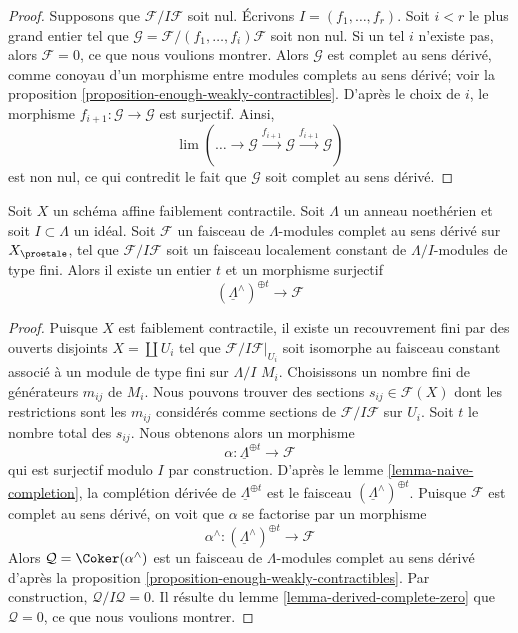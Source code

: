 \begin{proof}
Supposons que $\mathcal{F}/I\mathcal{F}$ soit nul.
Écrivons $I = (f_1, \ldots, f_r)$. Soit $i < r$ le plus grand
entier tel que $\mathcal{G} = \mathcal{F}/(f_1, \ldots, f_i)\mathcal{F}$
soit non nul. Si un tel $i$ n'existe pas, alors $\mathcal{F} = 0$, ce que nous
voulions montrer. Alors $\mathcal{G}$ est complet au sens dérivé, comme conoyau
d'un morphisme entre modules complets au sens dérivé; voir la
proposition \ref{proposition-enough-weakly-contractibles}.
D'après le choix de $i$, le morphisme $f_{i + 1} : \mathcal{G} \to \mathcal{G}$
est surjectif. Ainsi,
$$
\lim (\ldots \to \mathcal{G} \xrightarrow{f_{i + 1}} \mathcal{G}
\xrightarrow{f_{i + 1}} \mathcal{G})
$$
est non nul, ce qui contredit le fait que $\mathcal{G}$ soit complet au sens dérivé.
\end{proof}

\begin{lemma}
\label{lemma-derived-complete-limit}
Soit $X$ un schéma affine faiblement contractile.
Soit $\Lambda$ un anneau noethérien et soit $I \subset \Lambda$ un idéal.
Soit $\mathcal{F}$ un faisceau de $\Lambda$-modules complet au sens dérivé
sur $X_\proetale$, tel que $\mathcal{F}/I\mathcal{F}$ soit un faisceau localement
constant de $\Lambda/I$-modules de type fini.
Alors il existe un entier $t$ et un morphisme surjectif
$$
(\underline{\Lambda}^\wedge)^{\oplus t} \to \mathcal{F}
$$
\end{lemma}

\begin{proof}
Puisque $X$ est faiblement contractile, il existe un recouvrement fini par des ouverts disjoints
$X = \coprod U_i$ tel que $\mathcal{F}/I\mathcal{F}|_{U_i}$
soit isomorphe au faisceau constant associé à un module de type fini sur $\Lambda/I$
$M_i$. Choisissons un nombre fini de générateurs $m_{ij}$ de $M_i$. Nous
pouvons trouver des sections $s_{ij} \in \mathcal{F}(X)$ dont les restrictions sont les
$m_{ij}$ considérés comme sections de $\mathcal{F}/I\mathcal{F}$ sur $U_i$. 
Soit $t$ le nombre total des $s_{ij}$. Nous obtenons alors un morphisme
$$
\alpha : \underline{\Lambda}^{\oplus t} \longrightarrow \mathcal{F}
$$
qui est surjectif modulo $I$ par construction. D'après le
lemme \ref{lemma-naive-completion},
la complétion dérivée de $\underline{\Lambda}^{\oplus t}$ est le
faisceau $(\underline{\Lambda}^\wedge)^{\oplus t}$. Puisque $\mathcal{F}$
est complet au sens dérivé, on voit que $\alpha$ se factorise par un morphisme
$$
\alpha^\wedge :
(\underline{\Lambda}^\wedge)^{\oplus t}
\longrightarrow
\mathcal{F}
$$
Alors $\mathcal{Q} = \Coker(\alpha^\wedge)$ est un faisceau de
$\Lambda$-modules complet au sens dérivé d'après la
proposition \ref{proposition-enough-weakly-contractibles}.
Par construction, $\mathcal{Q}/I\mathcal{Q} = 0$. Il résulte du
lemme \ref{lemma-derived-complete-zero}
que $\mathcal{Q} = 0$, ce que nous voulions montrer.
\end{proof}








